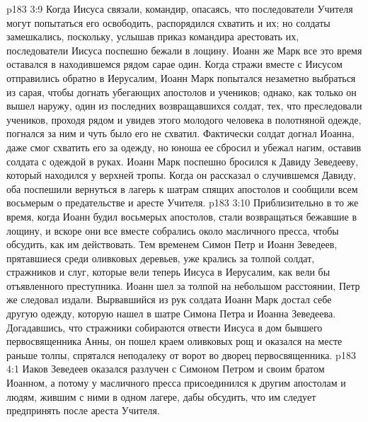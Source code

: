 \vs p183 3:9 Когда Иисуса связали, командир, опасаясь, что последователи Учителя могут попытаться его освободить, распорядился схватить и их; но солдаты замешкались, поскольку, услышав приказ командира арестовать их, последователи Иисуса поспешно бежали в лощину. Иоанн же Марк все это время оставался в находившемся рядом сарае один. Когда стражи вместе с Иисусом отправились обратно в Иерусалим, Иоанн Марк попытался незаметно выбраться из сарая, чтобы догнать убегающих апостолов и учеников; однако, как только он вышел наружу, один из последних возвращавшихся солдат, тех, что преследовали учеников, проходя рядом и увидев этого молодого человека в полотняной одежде, погнался за ним и чуть было его не схватил. Фактически солдат догнал Иоанна, даже смог схватить его за одежду, но юноша ее сбросил и убежал нагим, оставив солдата с одеждой в руках. Иоанн Марк поспешно бросился к Давиду Зеведееву, который находился у верхней тропы. Когда он рассказал о случившемся Давиду, оба поспешили вернуться в лагерь к шатрам спящих апостолов и сообщили всем восьмерым о предательстве и аресте Учителя.
\vs p183 3:10 Приблизительно в то же время, когда Иоанн будил восьмерых апостолов, стали возвращаться бежавшие в лощину, и вскоре они все вместе собрались около масличного пресса, чтобы обсудить, как им действовать. Тем временем Симон Петр и Иоанн Зеведеев, прятавшиеся среди оливковых деревьев, уже крались за толпой солдат, стражников и слуг, которые вели теперь Иисуса в Иерусалим, как вели бы отъявленного преступника. Иоанн шел за толпой на небольшом расстоянии, Петр же следовал издали. Вырвавшийся из рук солдата Иоанн Марк достал себе другую одежду, которую нашел в шатре Симона Петра и Иоанна Зеведеева. Догадавшись, что стражники собираются отвести Иисуса в дом бывшего первосвященника Анны, он пошел краем оливковых рощ и оказался на месте раньше толпы, спрятался неподалеку от ворот во дворец первосвященника.
\vs p183 4:1 Иаков Зеведеев оказался разлучен с Симоном Петром и своим братом Иоанном, а потому у масличного пресса присоединился к другим апостолам и людям, жившим с ними в одном лагере, дабы обсудить, что им следует предпринять после ареста Учителя.
